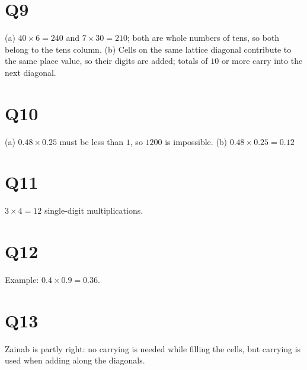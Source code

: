 \documentclass[12pt,a4paper]{article}
\begin{document}
\section*{Q9}
(a) \(40\times6=240\) and \(7\times30=210\); both are whole numbers of tens, so both belong to the tens column.
(b) Cells on the same lattice diagonal contribute to the same place value, so their digits are added; totals of \(10\) or more carry into the next diagonal.

\section*{Q10}
(a) \(0.48\times0.25\) must be less than \(1\), so \(1200\) is impossible.
(b) \(0.48\times0.25=0.12\)

\section*{Q11}
\(3\times4=12\) single-digit multiplications.

\section*{Q12}
Example: \(0.4\times0.9=0.36\).

\section*{Q13}
Zainab is partly right: no carrying is needed while filling the cells, but carrying is used when adding along the diagonals.
\end{document}
